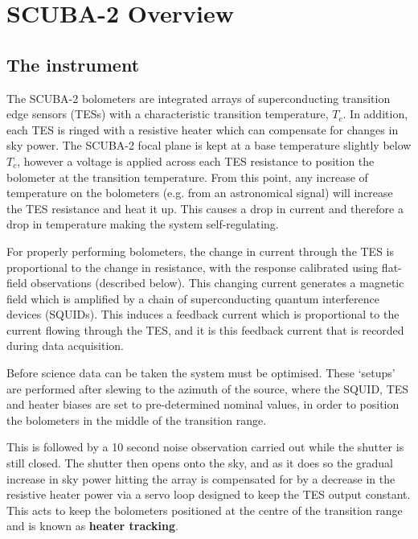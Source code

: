 \documentclass[twoside,11pt]{article}
\newcommand{\xlabel}[1]{}
\renewcommand{\_}{\texttt{\symbol{95}}}
\begin{document}
\clearpage
\section{\xlabel{scuba2_overview}SCUBA-2 Overview}
\subsection{\xlabel{scuba2}The instrument}
\label{sec:s2}
The SCUBA-2 bolometers are integrated arrays of superconducting transition edge sensors (TESs) with a characteristic transition temperature, $T_c$. In addition, each TES is ringed with a resistive heater which can compensate for changes in sky power. The SCUBA-2 focal plane is kept at a base temperature slightly below $T_c$, however a voltage is applied across each TES resistance to position the bolometer at the transition temperature.  From this point, any increase of temperature on the bolometers (e.g. from an astronomical signal) will increase the TES resistance and heat it up. This causes a drop in current and therefore a drop in temperature making the system self-regulating.

For properly performing bolometers, the change in current through the TES is proportional to the change in resistance, with the response calibrated using flat-field observations (described below). This changing current generates a magnetic field which is amplified by a chain of superconducting quantum interference devices (SQUIDs). This induces a feedback current which is proportional to the current flowing through the TES, and it is this feedback current that is recorded during data acquisition.


Before science data can be taken the system must be optimised. These `setups' are performed after slewing to the azimuth of the source, where the SQUID, TES and heater biases are set to pre-determined nominal values, in order to position the bolometers in the middle of the transition range.

 This is followed by a 10 second noise observation carried out while the shutter is still closed. The shutter then opens onto the sky, and as it does so the gradual increase in sky power hitting the array is compensated for by a decrease in the resistive heater power via a servo loop designed to keep the TES output constant. This acts to keep the bolometers positioned at the centre of the transition range and is known as \textbf{heater tracking}. 
\end{document}
